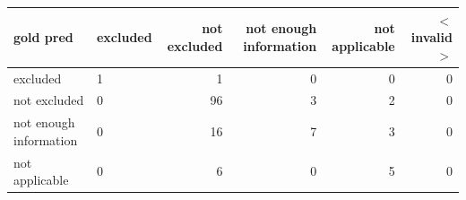 \begin{tabular}{llrrrr}
\toprule
gold  pred & excluded & not excluded & not enough information & not applicable & $<$invalid$>$ \\
\midrule
excluded & 1 & 1 & 0 & 0 & 0 \\
not excluded & 0 & 96 & 3 & 2 & 0 \\
not enough information & 0 & 16 & 7 & 3 & 0 \\
not applicable & 0 & 6 & 0 & 5 & 0 \\
\bottomrule
\end{tabular}

